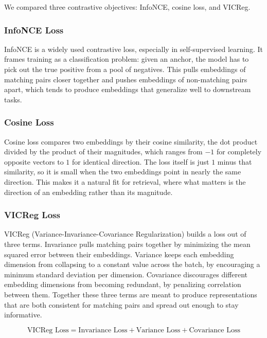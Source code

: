 \documentclass[11pt]{article}
\begin{document}
We compared three contrastive objectives: InfoNCE, cosine loss, and VICReg.

\subsubsection{InfoNCE Loss}

InfoNCE is a widely used contrastive loss, especially in self-supervised learning. It frames
training as a classification problem: given an anchor, the model has to pick out the true positive
from a pool of negatives. This pulls embeddings of matching pairs closer together and pushes
embeddings of non-matching pairs apart, which tends to produce embeddings that generalize well to
downstream tasks.

\subsubsection{Cosine Loss}

Cosine loss compares two embeddings by their cosine similarity, the dot product divided by the
product of their magnitudes, which ranges from $-1$ for completely opposite vectors to $1$ for
identical direction. The loss itself is just $1$ minus that similarity, so it is small when the two
embeddings point in nearly the same direction. This makes it a natural fit for retrieval, where
what matters is the direction of an embedding rather than its magnitude.

\subsubsection{VICReg Loss}

VICReg (Variance-Invariance-Covariance Regularization) builds a loss out of three terms.
Invariance pulls matching pairs together by minimizing the mean squared error between their
embeddings. Variance keeps each embedding dimension from collapsing to a constant value across the
batch, by encouraging a minimum standard deviation per dimension. Covariance discourages different
embedding dimensions from becoming redundant, by penalizing correlation between them. Together
these three terms are meant to produce representations that are both consistent for matching pairs
and spread out enough to stay informative.

\begin{equation}
    \text{VICReg Loss} = \text{Invariance Loss} + \text{Variance Loss} + \text{Covariance Loss}
\end{equation}
\end{document}
